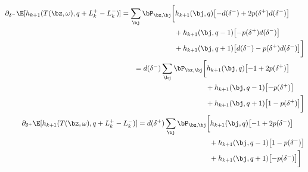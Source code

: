 \documentclass[12pt]{article}
\begin{document}
\begin{align}
\begin{split}
\partial_{\delta^-} \E[h_{k+1}(T(\bz,\omega), q + L_k^+ - L_k^- )] & = 
\sum_\bj \bP_{\bz,\bj} \biggl[ h_{k+1}(\bj, q) \bigl[ - d(\delta^-) + 2 p(\delta^+) d(\delta^-) \bigr]  \\
& \hphantom{\sum_\bj \bP_{\bz,\bj} \biggl[ {}+{}} + h_{k+1}(\bj, q-1) \bigl[  - p(\delta^+) d(\delta^-) \bigr]   \\
& \hphantom{\sum_\bj \bP_{\bz,\bj} \biggl[ {}+{}} + h_{k+1}(\bj, q+1) \bigl[ d(\delta^-)  - p(\delta^+) d(\delta^-) \bigr] \biggr]
\end{split} \\
\begin{split}
& = d(\delta^-) \sum_\bj \bP_{\bz,\bj} \biggl[ h_{k+1}(\bj, q) \bigl[ - 1 + 2 p(\delta^+) \bigr]  \\
& \hphantom{d(\delta^-) \sum_\bj \bP_{\bz,\bj} \biggl[ {}+{}} + h_{k+1}(\bj, q-1) \bigl[  - p(\delta^+) \bigr]   \\
& \hphantom{d(\delta^-) \sum_\bj \bP_{\bz,\bj} \biggl[ {}+{}} + h_{k+1}(\bj, q+1) \bigl[ 1  - p(\delta^+) \bigr] \biggr]
\end{split} \\
\begin{split}
\partial_{\delta^+} \E[h_{k+1}(T(\bz,\omega), q + L_k^+ - L_k^- )] & = 
d(\delta^+) \sum_\bj \bP_{\bz,\bj} \biggl[ h_{k+1}(\bj, q) \bigl[ - 1 + 2 p(\delta^-) \bigr]  \\
& \hphantom{d(\delta^-) \sum_\bj \bP_{\bz,\bj} \biggl[ {}+{}} + h_{k+1}(\bj, q-1) \bigl[1  - p(\delta^-) \bigr]   \\
& \hphantom{d(\delta^-) \sum_\bj \bP_{\bz,\bj} \biggl[ {}+{}} + h_{k+1}(\bj, q+1) \bigl[  - p(\delta^-) \bigr] \biggr]
\end{split}
\end{align}
\end{document}
